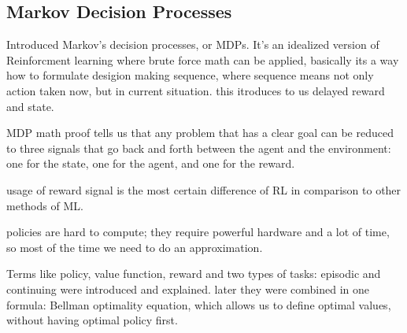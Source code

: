\subsection{Markov Decision Processes}
Introduced Markov's decision processes, or MDPs. It's an idealized version of Reinforcment learning where brute force math can be applied, basically its a way how to formulate desigion making sequence, where sequence means not only action taken now, but in current situation. this itroduces to us delayed reward and state.


MDP math proof tells us that any problem that has a clear goal can be reduced to three signals that go back and forth between the agent and the environment: one for the state, one for the agent, and one for the reward.

usage of reward signal is the most certain difference of RL in comparison to other methods of ML.

policies are hard to compute; they require powerful hardware and a lot of time, so most of the time we need to do an approximation.

Terms like policy, value function, reward and two types of tasks: episodic and continuing were introduced and explained. later they were combined in one formula: Bellman optimality equation, which allows us to define optimal values, without having optimal policy first.

  